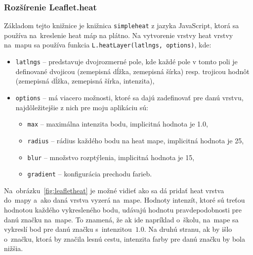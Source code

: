 \subsubsection{Rozšírenie Leaflet.heat}
Základom tejto knižnice je knižnica \texttt{simpleheat} z jazyka JavaScript, ktorá sa používa na~kreslenie heat máp na plátno. Na vytvorenie vrstvy heat vrstvy na~mapu sa používa funkcia \texttt{L.heatLayer(latlngs, options)}, kde:
\begin{itemize}
    \item \texttt{latlngs} \--- predstavuje dvojrozmerné pole, kde každé pole v tomto poli je definované dvojicou (zemepisná dĺžka, zemepisná šírka) resp. trojicou hodnôt (zemepisná dĺžka, zemepisná šírka, intenzita),
    \item \texttt{options} \--- má viacero možnosti, ktoré sa dajú zadefinovať pre danú vrstvu, najdôležitejšie z nich pre moju aplikáciu sú:
    \begin{itemize}
        \item \texttt{max} \--- maximálna intenzita bodu, implicitná hodnota je 1.0,
        \item \texttt{radius} \--- rádius každého bodu na heat mape, implicitná hodnota je 25,
        \item \texttt{blur} \--- množstvo rozptýlenia, implicitná hodnota je 15,
        \item \texttt{gradient} \--- konfigurácia prechodu farieb.
    \end{itemize}
\end{itemize}

Na~obrázku~\ref{fig:leafletheat} je možné vidieť ako sa dá pridať heat vrstva do~mapy a~ako daná vrstva vyzerá na~mape. Hodnoty intenzít, ktoré sú treťou hodnotou každého vykresleného bodu, udávajú hodnotu pravdepodobnosti pre danú značku na~mape. To znamená, že ak ide napríklad o~školu, na~mape sa vykreslí bod pre danú značku s~intenzitou~$1.0$. Na druhú stranu, ak by išlo o~značku, ktorá by značila lesnú cestu, intenzita farby pre danú značku by bola nižšia.


